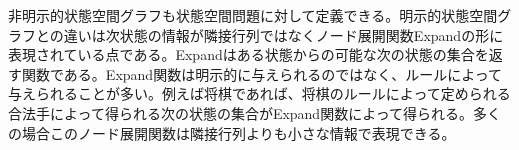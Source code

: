 
非明示的状態空間グラフも状態空間問題に対して定義できる。明示的状態空間グラフとの違いは次状態の情報が隣接行列ではなくノード展開関数Expandの形に表現されている点である。Expandはある状態からの可能な次の状態の集合を返す関数である。Expand関数は明示的に与えられるのではなく、ルールによって与えられることが多い。例えば将棋であれば、将棋のルールによって定められる合法手によって得られる次の状態の集合がExpand関数によって得られる。多くの場合このノード展開関数は隣接行列よりも小さな情報で表現できる。

